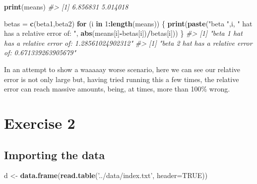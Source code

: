 \documentclass[]{article}
\newenvironment{Shaded}{\begin{snugshade}}{\end{snugshade}}
\newcommand{\CommentTok}[1]{\textcolor[rgb]{0.56,0.35,0.01}{\textit{#1}}}
\newcommand{\ControlFlowTok}[1]{\textcolor[rgb]{0.13,0.29,0.53}{\textbf{#1}}}
\newcommand{\DataTypeTok}[1]{\textcolor[rgb]{0.13,0.29,0.53}{#1}}
\newcommand{\DecValTok}[1]{\textcolor[rgb]{0.00,0.00,0.81}{#1}}
\newcommand{\KeywordTok}[1]{\textcolor[rgb]{0.13,0.29,0.53}{\textbf{#1}}}
\newcommand{\NormalTok}[1]{#1}
\newcommand{\OperatorTok}[1]{\textcolor[rgb]{0.81,0.36,0.00}{\textbf{#1}}}
\newcommand{\OtherTok}[1]{\textcolor[rgb]{0.56,0.35,0.01}{#1}}
\newcommand{\StringTok}[1]{\textcolor[rgb]{0.31,0.60,0.02}{#1}}
\begin{document}
\begin{Shaded}
\begin{Highlighting}[]
\KeywordTok{print}\NormalTok{(means)}
\CommentTok{#> [1] 6.856831 5.014018}
\end{Highlighting}
\end{Shaded}

\begin{Shaded}
\begin{Highlighting}[]
\NormalTok{betas =}\StringTok{ }\KeywordTok{c}\NormalTok{(beta1,beta2)}
\ControlFlowTok{for}\NormalTok{ (i }\ControlFlowTok{in} \DecValTok{1}\OperatorTok{:}\KeywordTok{length}\NormalTok{(means)) \{}
    \KeywordTok{print}\NormalTok{(}\KeywordTok{paste}\NormalTok{(}\StringTok{"beta "}\NormalTok{,i, }\StringTok{" hat has a relative error of: "}\NormalTok{, }\KeywordTok{abs}\NormalTok{(means[i]}\OperatorTok{-}\NormalTok{betas[i])}\OperatorTok{/}\NormalTok{betas[i]))}
\NormalTok{\}}
\CommentTok{#> [1] "beta  1  hat has a relative error of:  1.28561024902312"}
\CommentTok{#> [1] "beta  2  hat has a relative error of:  0.671339263905679"}
\end{Highlighting}
\end{Shaded}

In an attempt to show a waaaaay worse scenario, here we can see our
relative error is not only large but, having tried running this a few
times, the relative error can reach massive amounts, being, at times,
more than 100\% wrong.

\newpage

\newpage

\hypertarget{exercise-2}{%
\section{Exercise 2}\label{exercise-2}}

\hypertarget{importing-the-data}{%
\subsection{Importing the data}\label{importing-the-data}}

\begin{Shaded}
\begin{Highlighting}[]
\NormalTok{d <-}\StringTok{ }\KeywordTok{data.frame}\NormalTok{(}\KeywordTok{read.table}\NormalTok{(}\StringTok{'../data/index.txt'}\NormalTok{, }\DataTypeTok{header=}\OtherTok{TRUE}\NormalTok{))}
\end{Highlighting}
\end{Shaded}
\end{document}
